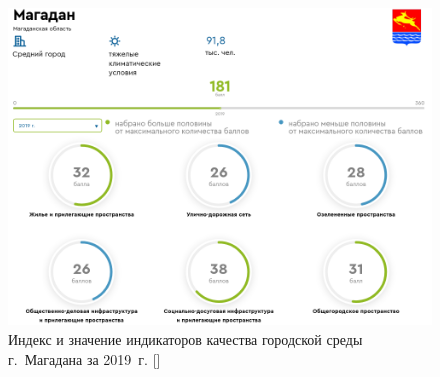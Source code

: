 \begin{figure}[h!]
  \begin{center}
    \includegraphics[width=1\textwidth]{authors/kodirev-fig-1.png}
  \end{center}
  \caption{Индекс и значение индикаторов качества городской среды г.~Магадана за 2019~г. []}
  \label{fig:kodirev-fig-1}
\end{figure}
